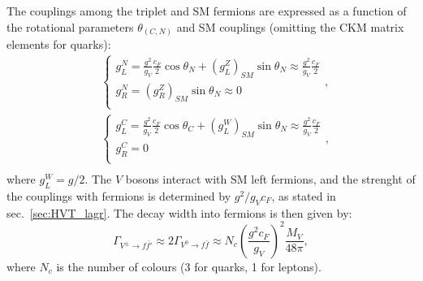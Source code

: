 The couplings among the triplet and SM fermions are expressed as a function of the rotational parameters $\theta_{(C,N)}$ and SM couplings (omitting the CKM matrix elements for quarks):
\begin{equation}
\begin{split}
&
\left\{
\begin{array}{l}
g_L^N = \frac{g^2}{g_V} \frac{c_F}{2} \cos{{\theta}_N} + \left( g_L^Z \right)_{SM} \sin{{\theta}_N} \approx \frac{g^2}{g_V} \frac{c_F}{2} \\
g_R^N = \left( g_R^Z \right)_{SM} \sin{{\theta}_N} \approx 0\\
\end{array}
\right.
,\\
&
\left\{
\begin{array}{l}
g_L^C = \frac{g^2}{g_V} \frac{c_F}{2} \cos{{\theta}_C} + \left( g_L^W \right)_{SM} \sin{{\theta}_N} \approx \frac{g^2}{g_V} \frac{c_F}{2} \\
g_R^C = 0\\
\end{array}
\right.
,\\
\end{split}
\label{eq:HVT_couplings}
\end{equation}
where $g_L^W = g/2$. The $V$ bosons interact with SM left fermions, and the strenght of the couplings with fermions is determined by $g^2/g_V c_F$, as stated in sec.~\ref{sec:HVT_lagr}. The decay width into fermions is then given by:
\begin{equation}
\Gamma_{V^{\pm} \rightarrow f \bar{f'}} \approx 2 \Gamma_{V^{0} \rightarrow f \bar{f}} \approx N_c {\left( \frac{g^2 c_F}{g_V}\right)}^2 \frac{M_V}{48 \pi},
\label{eq:HVT_width_fermions}
\end{equation}
where $N_c$ is the number of colours (3 for quarks, 1 for leptons).

